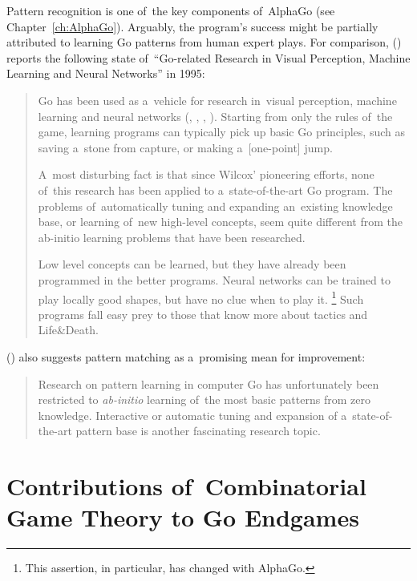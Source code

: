 Pattern recognition is one of~the key components of~AlphaGo (see Chapter~\ref{ch:AlphaGo}).
Arguably, the program's success might be partially attributed to learning Go patterns from human expert plays.
For comparison, (\cite{Muller1995computer}) reports the following state of~``Go-related Research in Visual Perception, Machine Learning and Neural Networks'' in 1995:
\begin{quotation} \noindent
  Go has been used as a~vehicle for research in~visual perception, machine learning and neural networks (\cite{Wilcox79}, \cite{Enderton1991golem}, \cite{Stoutamire1991machine}, \cite{Schraudolph1994temporal}).
  Starting from only the rules of~the game, learning programs can typically pick up basic Go principles, such as saving a~stone from capture, or making a~[one-point] jump.

  A~most disturbing fact is that since Wilcox’ pioneering efforts, none of~this research has been applied to a~state-of-the-art Go program.
  The problems of~automatically tuning and expanding an~existing knowledge base, or learning of~new high-level concepts, seem quite different from the ab-initio learning problems that have been researched.

  Low level concepts can be learned, but they have already been programmed in the better programs.
  Neural networks can be trained to play locally good shapes, but have no clue when to play it.%
  \footnote{This assertion, in particular, has changed with AlphaGo.}
  Such programs fall easy prey to those that know more about tactics and Life\&Death.
\end{quotation}
(\cite{Muller1995computer}) also suggests pattern matching as a~promising mean for improvement:
\begin{quotation} \noindent
  Research on pattern learning in computer Go has unfortunately been restricted to \emph{ab-initio} learning of~the most basic patterns from zero knowledge.
  Interactive or automatic tuning and expansion of a~state-of-the-art pattern base is another fascinating research topic.
\end{quotation}

\section{Contributions of~Combinatorial Game Theory to Go Endgames}

